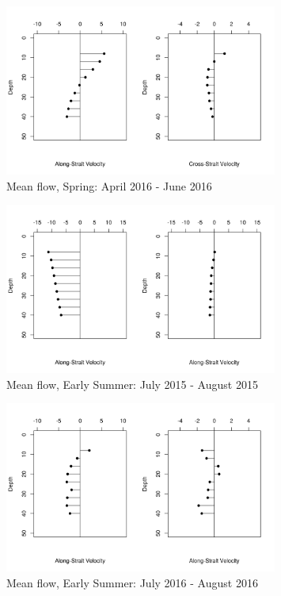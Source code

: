 \documentclass[12pt]{dforeport}
\begin{document}
\begin{figure}  
\centering
\includegraphics[width = 0.8\textwidth]{./figures/45_smf_spring_2016.png}
\caption[Mean flow, Spring, 2016]{Mean flow, Spring: April 2016 - June 2016}
\label{f:smf_s_2016}
\end{figure}


\begin{figure}  
\centering
\includegraphics[width = 0.8\textwidth]{./figures/46_smf_earlySummer_2015.png}
\caption[Mean flow, Early Summer, 2015]{Mean flow, Early Summer: July 2015 - August 2015}
\label{f:smf_es_2015}
\end{figure}

\begin{figure}  
\centering
\includegraphics[width = 0.8\textwidth]{./figures/47_smf_earlySummer_2016.png}
\caption[Mean flow, Early Summer, 2016]{Mean flow, Early Summer: July 2016 - August 2016}
\label{f:smf_es_2016}
\end{figure}
\end{document}
